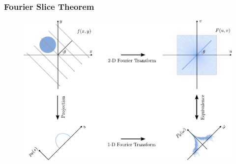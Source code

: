 \begin{frame}
	\frametitle{Fourier Slice Theorem}

	\begin{figure}[tbp]
		\centering
		\includegraphics[width=0.6\linewidth]{images/fourier_1}
		\label{fig:ct_fourier_1}
	\end{figure}

\end{frame}

